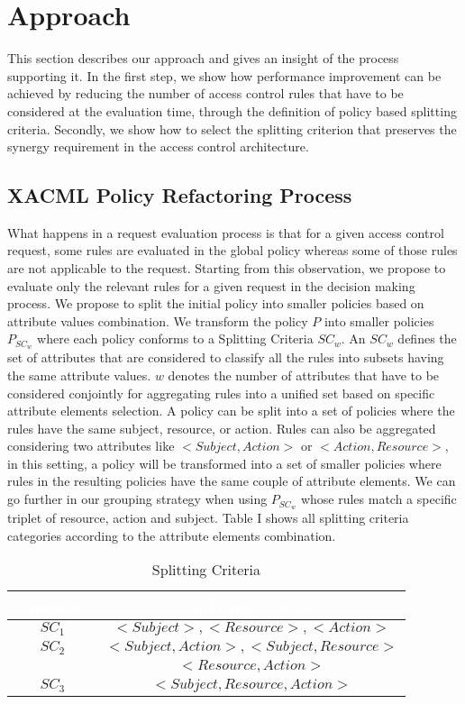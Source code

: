 

\section{Approach} \label{sec:approach}
This section describes our approach and gives an insight of the process supporting it. In the first step, we show how performance improvement can be achieved by
reducing the number of access control rules that have to be considered at the evaluation time, through the definition of policy based splitting criteria. 
Secondly, we show how to select the splitting criterion that preserves the synergy requirement in the access control architecture.

\subsection{XACML Policy Refactoring Process}
What happens in a request evaluation process is that for a given access control request, some rules are evaluated in the global policy whereas some of those rules are not
 applicable to the request. Starting from this observation, we propose to evaluate only the relevant rules for a given request in the decision making process. 
We propose to split the initial policy into smaller policies based on attribute values combination. We transform the policy \normalsize $P$ into smaller 
policies \normalsize $P_{SC_{w}}$ where each policy conforms to a Splitting Criteria $SC_{w}$. An $SC_{w}$ defines the set of attributes that are considered 
to classify all the rules into subsets having the same attribute values. $w$ denotes the number of attributes that have to be considered conjointly for aggregating rules into
 a unified set based on specific attribute elements selection. A policy can be split into a set of policies where the rules have the same subject, resource, or action. 
Rules can also be aggregated considering two attributes like $<Subject, Action>$ or $<Action, Resource>$, in this setting, a policy will be transformed into a set of smaller 
policies where rules in the resulting policies have the same couple of attribute elements. We can go further in our grouping strategy when using $P_{SC_{w}}$ whose 
rules match a specific triplet of resource, action and subject. Table I shows all splitting criteria categories according to the attribute elements combination.
\begin{table}[h!]
\centering
\setlength{\extrarowheight}{6 pt}
\begin{tabular}{|>{\small}c|>{\small}c|} 
\hline  \rowcolor{black} 
 \bf
\textcolor{white}{Categories}& \bf \textcolor{white}{Splitting Criteria}\\ \hline
 $SC_{1}$& {$<Subject>, <Resource>, <Action>$}\\ \hline

$SC_{2}$& {$<Subject,Action>, <Subject,Resource>$}\\&{$<Resource,Action>$}\\  \hline

$SC_{3}$& {$<Subject,Resource,Action>$}\\ \hline
\end{tabular}
\caption{Splitting Criteria}
\label{table1}\end{table}

